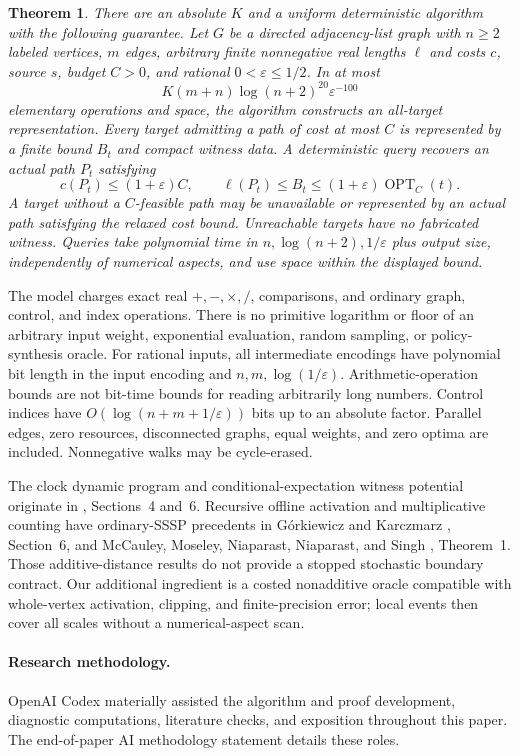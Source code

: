 \documentclass[acmsmall,11pt,screen,nonacm]{acmart}
\newcommand{\OPT}{\operatorname{OPT}}
\newtheorem{theorem}{Theorem}
\begin{document}
\begin{theorem}\label{thm:main}
There are an absolute $K$ and a uniform deterministic algorithm with the following guarantee. Let $G$ be a directed adjacency-list graph with $n\ge2$ labeled vertices, $m$ edges, arbitrary finite nonnegative real lengths $\ell$ and costs $c$, source $s$, budget $C>0$, and rational $0<\varepsilon\le1/2$. In at most
\[
 K(m+n)\log(n+2)^{20}\varepsilon^{-100}
\]
elementary operations and space, the algorithm constructs an all-target representation. Every target admitting a path of cost at most $C$ is represented by a finite bound $B_t$ and compact witness data. A deterministic query recovers an actual path $P_t$ satisfying
\[
 c(P_t)\le(1+\varepsilon)C,\qquad
 \ell(P_t)\le B_t\le(1+\varepsilon)\OPT_C(t).
\]
A target without a $C$-feasible path may be unavailable or represented by an actual path satisfying the relaxed cost bound. Unreachable targets have no fabricated witness. Queries take polynomial time in $n,\log(n+2),1/\varepsilon$ plus output size, independently of numerical aspects, and use space within the displayed bound.
\end{theorem}
The model charges exact real $+,-,\times,/$, comparisons, and ordinary graph, control, and index operations. There is no primitive logarithm or floor of an arbitrary input weight, exponential evaluation, random sampling, or policy-synthesis oracle. For rational inputs, all intermediate encodings have polynomial bit length in the input encoding and $n,m,\log(1/\varepsilon)$. Arithmetic-operation bounds are not bit-time bounds for reading arbitrarily long numbers. Control indices have $O(\log(n+m+1/\varepsilon))$ bits up to an absolute factor. Parallel edges, zero resources, disconnected graphs, equal weights, and zero optima are included. Nonnegative walks may be cycle-erased.

The clock dynamic program and conditional-expectation witness potential originate in \cite{A26}, Sections~4 and~6. Recursive offline activation and multiplicative counting have ordinary-SSSP precedents in G\'orkiewicz and Karczmarz \cite{GK25}, Section~6, and McCauley, Moseley, Niaparast, Niaparast, and Singh \cite{MMNNS25}, Theorem~1. Those additive-distance results do not provide a stopped stochastic boundary contract. Our additional ingredient is a costed nonadditive oracle compatible with whole-vertex activation, clipping, and finite-precision error; local events then cover all scales without a numerical-aspect scan.

\paragraph{Research methodology.}
OpenAI Codex materially assisted the algorithm and proof development, diagnostic computations, literature checks, and exposition throughout this paper. The end-of-paper AI methodology statement details these roles.
\end{document}
